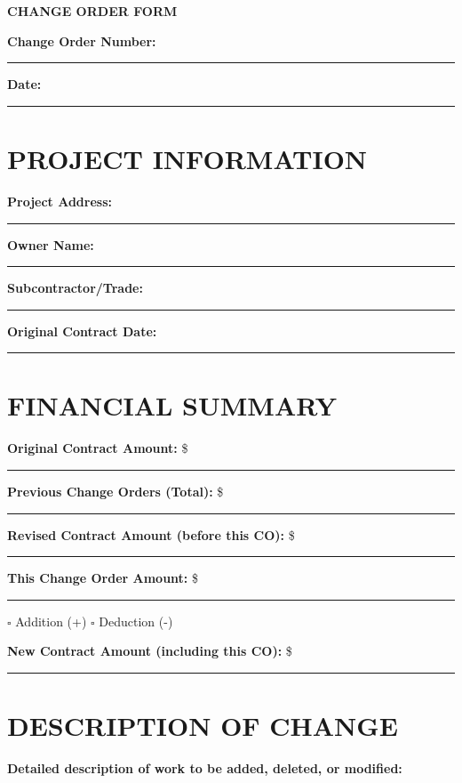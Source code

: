 \documentclass[11pt,letterpaper]{article}
\begin{document}
\begin{center}
\textbf{\Large CHANGE ORDER FORM}
\end{center}

\vspace{12pt}

\textbf{Change Order Number:} \rule{3cm}{0.4pt}

\textbf{Date:} \rule{4cm}{0.4pt}

\vspace{6pt}

\section*{PROJECT INFORMATION}

\textbf{Project Address:} \rule{10cm}{0.4pt}

\textbf{Owner Name:} \rule{10cm}{0.4pt}

\textbf{Subcontractor/Trade:} \rule{9cm}{0.4pt}

\textbf{Original Contract Date:} \rule{5cm}{0.4pt}

\vspace{6pt}

\section*{FINANCIAL SUMMARY}

\textbf{Original Contract Amount:} \$ \rule{5cm}{0.4pt}

\textbf{Previous Change Orders (Total):} \$ \rule{5cm}{0.4pt}

\textbf{Revised Contract Amount (before this CO):} \$ \rule{5cm}{0.4pt}

\textbf{This Change Order Amount:} \$ \rule{5cm}{0.4pt}

\hspace{1in} $\square$ Addition (+) \hspace{0.5in} $\square$ Deduction (-)

\textbf{New Contract Amount (including this CO):} \$ \rule{5cm}{0.4pt}

\vspace{6pt}

\section*{DESCRIPTION OF CHANGE}

\textbf{Detailed description of work to be added, deleted, or modified:}

\vspace{4pt}
\end{document}
